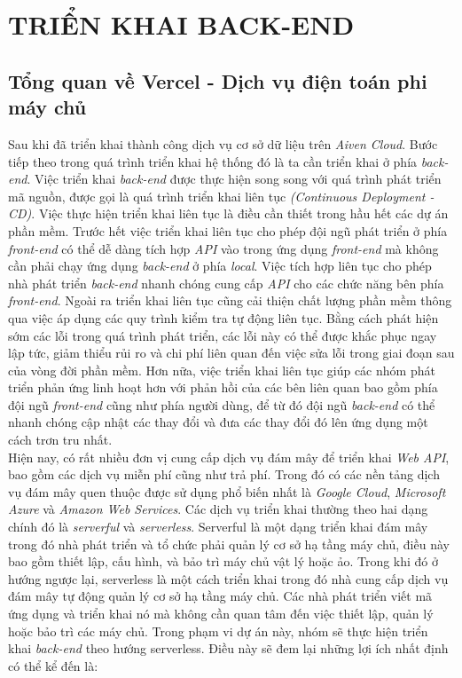 \section{TRIỂN KHAI BACK-END}
\subsection{Tổng quan về Vercel - Dịch vụ điện toán phi máy chủ}
\hspace*{1cm}
Sau khi đã triển khai thành công dịch vụ cơ sở dữ liệu trên \textit{Aiven Cloud}. Bước tiếp theo trong quá trình triển khai hệ thống đó là ta cần triển khai ở phía \textit{back-end}. Việc triển khai \textit{back-end} được thực hiện song song với quá trình phát triển mã nguồn, được gọi là quá trình triển khai liên tục \textit{(Continuous Deployment - CD)}. Việc thực hiện triển khai liên tục là điều cần thiết trong hầu hết các dự án phần mềm. Trước hết việc triển khai liên tục cho phép đội ngũ phát triển ở phía \textit{front-end} có thể dễ dàng tích hợp \textit{API} vào trong ứng dụng \textit{front-end} mà không cần phải chạy ứng dụng \textit{back-end} ở phía \textit{local}. Việc tích hợp liên tục cho phép nhà phát triển \textit{back-end} nhanh chóng cung cấp \textit{API} cho các chức năng bên phía \textit{front-end}. Ngoài ra triển khai liên tục cũng cải thiện chất lượng phần mềm thông qua việc áp dụng các quy trình kiểm tra tự động liên tục. Bằng cách phát hiện sớm các lỗi trong quá trình phát triển, các lỗi này có thể được khắc phục ngay lập tức, giảm thiểu rủi ro và chi phí liên quan đến việc sửa lỗi trong giai đoạn sau của vòng đời phần mềm. Hơn nữa, việc triển khai liên tục giúp các nhóm phát triển phản ứng linh hoạt hơn với phản hồi của các bên liên quan bao gồm phía đội ngũ \textit{front-end} cũng như phía người dùng, để từ đó đội ngũ \textit{back-end} có thể nhanh chóng cập nhật các thay đổi và đưa các thay đổi đó lên ứng dụng một cách trơn tru nhất.\\
\hspace*{1cm}
Hiện nay, có rất nhiều đơn vị cung cấp dịch vụ đám mây để triển khai \textit{Web API}, bao gồm các dịch vụ miễn phí cũng như trả phí. Trong đó có các nền tảng dịch vụ đám mây quen thuộc được sử dụng phổ biến nhất là \textit{Google Cloud}, \textit{Microsoft Azure} và \textit{Amazon Web Services}. Các dịch vụ triển khai thường theo hai dạng chính đó là \textit{serverful} và \textit{serverless}. Serverful là một dạng triển khai đám mây trong đó nhà phát triển và tổ chức phải quản lý cơ sở hạ tầng máy chủ, điều này bao gồm thiết lập, cấu hình, và bảo trì máy chủ vật lý hoặc ảo. Trong khi đó ở hướng ngược lại, serverless là một cách triển khai trong đó nhà cung cấp dịch vụ đám mây tự động quản lý cơ sở hạ tầng máy chủ. Các nhà phát triển viết mã ứng dụng và triển khai nó mà không cần quan tâm đến việc thiết lập, quản lý hoặc bảo trì các máy chủ. Trong phạm vi dự án này, nhóm sẽ thực hiện triển khai \textit{back-end} theo hướng serverless. Điều này sẽ đem lại những lợi ích nhất định có thể kể đến là:
